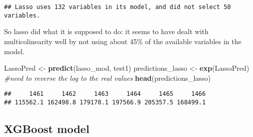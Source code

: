 \documentclass[]{article}
\newenvironment{Shaded}{\begin{snugshade}}{\end{snugshade}}
\newcommand{\KeywordTok}[1]{\textcolor[rgb]{0.13,0.29,0.53}{\textbf{#1}}}
\newcommand{\DataTypeTok}[1]{\textcolor[rgb]{0.13,0.29,0.53}{#1}}
\newcommand{\DecValTok}[1]{\textcolor[rgb]{0.00,0.00,0.81}{#1}}
\newcommand{\StringTok}[1]{\textcolor[rgb]{0.31,0.60,0.02}{#1}}
\newcommand{\CommentTok}[1]{\textcolor[rgb]{0.56,0.35,0.01}{\textit{#1}}}
\newcommand{\OperatorTok}[1]{\textcolor[rgb]{0.81,0.36,0.00}{\textbf{#1}}}
\newcommand{\NormalTok}[1]{#1}
\begin{document}
\begin{Shaded}
\end{Shaded}

\begin{verbatim}
## Lasso uses 132 variables in its model, and did not select 50 variables.
\end{verbatim}

So lasso did what it is supposed to do: it seems to have dealt with
multicolinearity well by not using about 45\% of the available variables
in the model.

\begin{Shaded}
\begin{Highlighting}[]
\NormalTok{LassoPred <-}\StringTok{ }\KeywordTok{predict}\NormalTok{(lasso_mod, test1)}
\NormalTok{predictions_lasso <-}\StringTok{ }\KeywordTok{exp}\NormalTok{(LassoPred) }\CommentTok{#need to reverse the log to the real values}
\KeywordTok{head}\NormalTok{(predictions_lasso)}
\end{Highlighting}
\end{Shaded}

\begin{verbatim}
##     1461     1462     1463     1464     1465     1466 
## 115562.1 162498.8 179170.1 197566.9 205357.5 168499.1
\end{verbatim}

\subsection{XGBoost model}\label{xgboost-model}
\end{document}
